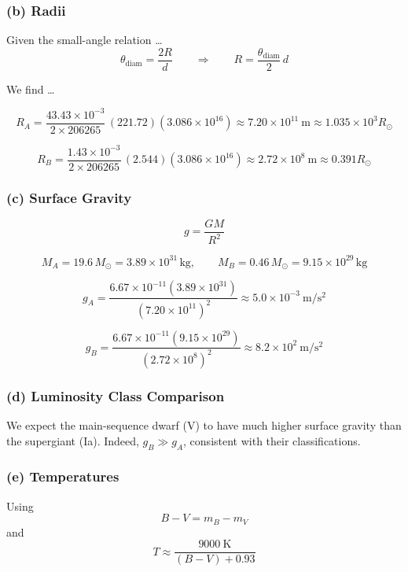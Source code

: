 \documentclass{article}
\begin{document}
\subsubsection*{(b) Radii}

Given the small-angle relation \dots
\[
\theta_\mathrm{diam} = \frac{2R}{d} \qquad \Rightarrow \qquad R = \frac{\theta_\mathrm{diam}}{2}\,d
\]

We find \dots

\[
R_A = \frac{43.43\times10^{-3}}{2\times206265}\,(221.72)(3.086\times10^{16})
   \boxed{\approx 7.20\times10^{11}~\mathrm{m}  \approx 1.035\times10^{3}R_\odot}
\]

\[
R_B = \frac{1.43\times10^{-3}}{2\times206265}\,(2.544)(3.086\times10^{16})
   \boxed{\approx 2.72\times10^{8}~\mathrm{m} \approx 0.391R_\odot}
\]


\subsubsection*{(c) Surface Gravity}

\[
g = \frac{GM}{R^2}
\]

\[
M_A = 19.6\,M_\odot = 3.89\times10^{31}\,\mathrm{kg}, \qquad
M_B = 0.46\,M_\odot = 9.15\times10^{29}\,\mathrm{kg}
\]

\[
g_A = \frac{6.67\times10^{-11}(3.89\times10^{31})}{(7.20\times10^{11})^2}
     \boxed{\approx 5.0\times10^{-3}~\mathrm{m/s^2}}
\]

\[
g_B = \frac{6.67\times10^{-11}(9.15\times10^{29})}{(2.72\times10^{8})^2}
     \boxed{\approx 8.2\times10^{2}~\mathrm{m/s^2}}
\]

\subsubsection*{(d) Luminosity Class Comparison}

We expect the main-sequence dwarf (V) to have much higher surface gravity than the supergiant (Ia).  
Indeed, $g_B \gg g_A$, consistent with their classifications.

\subsubsection*{(e) Temperatures}

Using
\begin{equation}
B - V = m_B - m_V
\tag{13.35}
\end{equation}
and
\begin{equation}
T \approx \frac{9000~\mathrm{K}}{(B - V) + 0.93}
\tag{13.36}
\end{equation}
\end{document}
